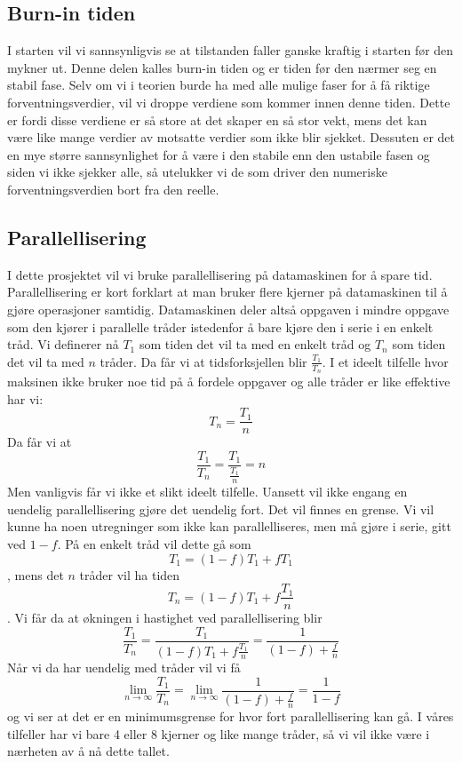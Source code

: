 \documentclass[reprint,english,notitlepage]{revtex4-2}  %
\begin{document}
\subsection{Burn-in tiden}
I starten vil vi sannsynligvis se at tilstanden faller ganske kraftig i starten før den mykner ut. Denne delen kalles burn-in tiden og er tiden før den nærmer seg en stabil fase. Selv om vi i teorien burde ha med alle mulige faser for å få riktige forventningsverdier, vil vi droppe verdiene som kommer innen denne tiden. Dette er fordi disse verdiene er så store at det skaper en så stor vekt, mens det kan være like mange verdier av motsatte verdier som ikke blir sjekket. Dessuten er det en mye større sannsynlighet for å være i den stabile enn den ustabile fasen og siden vi ikke sjekker alle, så utelukker vi de som driver den numeriske forventningsverdien bort fra den reelle.
\subsection{Parallellisering}
I dette prosjektet vil vi bruke parallellisering på datamaskinen for å spare tid. Parallellisering er kort forklart at man bruker flere kjerner på datamaskinen til å gjøre operasjoner samtidig. Datamaskinen deler altså oppgaven i mindre oppgave som den kjører i parallelle tråder istedenfor å bare kjøre den i serie i en enkelt tråd. Vi definerer nå $T_1$ som tiden det vil ta med en enkelt tråd og $T_n$ som tiden det vil ta med $n$ tråder. Da får vi at tidsforksjellen blir $\frac{T_1}{T_n}$. I et ideelt tilfelle hvor maksinen ikke bruker noe tid på å fordele oppgaver og alle tråder er like effektive har vi:
$$
T_n=\frac{T_1}{n}
$$
Da får vi at
$$
\frac{T_1}{T_n}=\frac{T_1}{\frac{T_1}{n}}=n
$$
Men vanligvis får vi ikke et slikt ideelt tilfelle. Uansett vil ikke engang en uendelig parallellisering gjøre det uendelig fort. Det vil finnes en grense. Vi vil kunne ha noen utregninger som ikke kan parallelliseres, men må gjøre i serie, gitt ved $1-f$. På en enkelt tråd vil dette gå som $$T_1=(1-f)T_1+fT_1$$, mens det $n$ tråder vil ha tiden $$T_n=(1-f)T_1+f\frac{T_1}{n}$$. Vi får da at økningen i hastighet ved parallellisering blir
$$
\frac{T_1}{T_n}=\frac{T_1}{(1-f)T_1+f\frac{T_1}{n}}=\frac{1}{(1-f)+\frac{f}{n}}
$$
Når vi da har uendelig med tråder vil vi få
$$
\lim_{n\rightarrow \infty}\frac{T_1}{T_n}=\lim_{n\rightarrow \infty}\frac{1}{(1-f)+\frac{f}{n}}=\frac{1}{1-f}
$$
og vi ser at det er en minimumsgrense for hvor fort parallellisering kan gå. I våres tilfeller har vi bare 4 eller 8 kjerner og like mange tråder, så vi vil ikke være i nærheten av å nå dette tallet.
\end{document}
